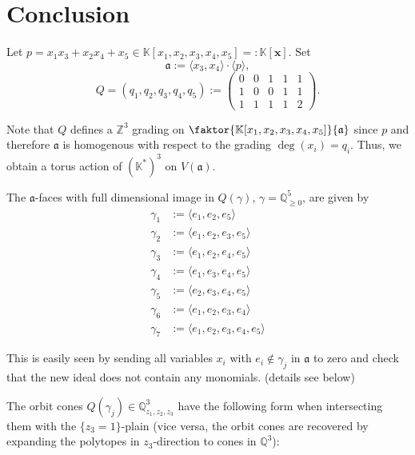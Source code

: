 \chapter{Conclusion}

Let $p = x_1x_3+x_2x_4+x_5\in \mathbb{K}[x_1,x_2,x_3,x_4,x_5] =: \mathbb{K}[\mathbf{x}]$. Set 
$$\mathfrak{a} := \langle x_3, x_4\rangle \cdot \langle p\rangle,$$
$$Q = (q_1, q_2, q_3, q_4, q_5) := \begin{pmatrix}
0 & 0 & 1 & 1 & 1 \\
1 & 0 & 0 & 1 & 1 \\
1 & 1 & 1 & 1 & 2 
\end{pmatrix}.$$

Note that $Q$ defines a $\mathbb{Z}^3$ grading on $\faktor{\mathbb{K}[x_1,x_2,x_3,x_4,x_5]}{\mathfrak{a}}$ since $p$ and therefore $\mathfrak{a}$ is homogenous with respect to the grading $\deg(x_i) = q_i$. Thus, we obtain a torus action of $(\mathbb{K}^*)^3$ on $V(\mathfrak{a})$.

The $\mathfrak{a}$-faces with full dimensional image in $Q(\gamma)$, $\gamma = \mathbb{Q}^5_{\geq 0}$, are given by
\begin{align*}
\gamma_1 &:=\langle e_1, e_2, e_5\rangle \\
\gamma_2 &:=\langle e_1, e_2, e_3, e_5\rangle \\
\gamma_3 &:=\langle e_1, e_2, e_4, e_5\rangle \\
\gamma_4 &:=\langle e_1, e_3, e_4, e_5\rangle \\
\gamma_5 &:=\langle e_2, e_3, e_4, e_5\rangle \\
\gamma_6 &:=\langle e_1, e_2, e_3, e_4\rangle \\
\gamma_7 &:=\langle e_1, e_2, e_3, e_4, e_5\rangle
\end{align*}

This is easily seen by sending all variables $x_i$ with $e_i\notin \gamma_j$ in $\mathfrak{a}$ to zero and check that the new ideal does not contain any monomials. (details see below)

The orbit cones $Q(\gamma_j)\in \mathbb{Q}^3_{z_1,z_2,z_3}$ have the following form when intersecting them with the $\{z_3 = 1\}$-plain (vice versa, the orbit cones are recovered by expanding the polytopes in $z_3$-direction to cones in $\mathbb{Q}^3$):

